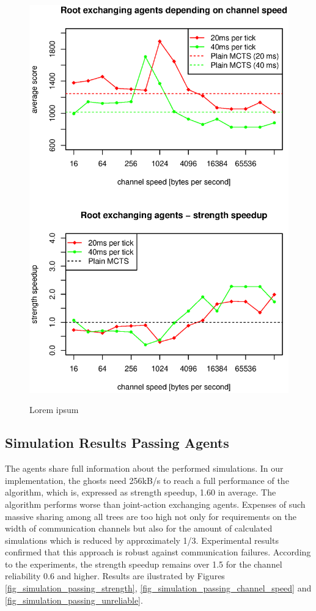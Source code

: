 \begin{figure}
\begin{center}
\includegraphics{img/root-exchange-channel-speed.eps}
\end{center}
\caption{\footnotesize Lorem ipsum}{\footnotesize }
\label{fig_root_exchanging_channel_speed}
\end{figure}




\subsection{Simulation Results Passing Agents}

The agents share full information about the performed simulations. In our implementation, the
ghosts need 256kB/s to reach a full performance of the algorithm, which is, expressed as
strength speedup, 1.60 in average. The algorithm performs worse than joint-action exchanging
agents. Expenses of such massive sharing among all trees are too high not only for requirements
on the width of communication channels but also for the amount of calculated simulations which
is reduced by approximately 1/3. Experimental results confirmed that this approach is robust
against communication failures. According to the experiments, the strength speedup remains
over 1.5 for the channel reliability 0.6 and higher. Results are ilustrated by Figures
\ref{fig_simulation_passing_strength}, \ref{fig_simulation_passing_channel_speed} and
\ref{fig_simulation_passing_unreliable}.


